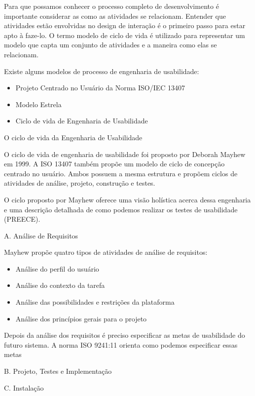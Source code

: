 	Para que possamos conhecer o processo completo de desenvolvimento é importante considerar as como as atividades se relacionam. Entender que atividades estão envolvidas no design de interação é o primeiro passo para estar apto à faze-lo.
	O termo modelo de ciclo de vida é utilizado para representar um modelo que capta um conjunto de atividades e a maneira como elas se relacionam. ~\cite{preece2005interacao}

	Existe alguns modelos de processo de engenharia de usabilidade:

\begin{itemize}
\item Projeto Centrado no Usuário da Norma ISO/IEC 13407
\item Modelo Estrela
\item Ciclo de vida de Engenharia de Usabilidade
\end{itemize}


O ciclo de vida da Engenharia de Usabilidade

	
	O ciclo de vida de engenharia de usabilidade foi proposto por Deborah Mayhew em 1999. 
A ISO 13407 também propõe um modelo de ciclo de concepção centrado no usuário. Ambos possuem a mesma estrutura e propõem ciclos de atividades de análise, projeto, construção e testes. ~\cite{cybis2010ergonomia}

	O ciclo proposto por Mayhew oferece uma visão holística acerca dessa engenharia e uma descrição detalhada de como podemos realizar os testes de usabilidade (PREECE).

A. Análise de Requisitos

	Mayhew propõe quatro tipos de atividades de análise de requisitos: 

\begin{itemize}
\item Análise do perfil do usuário
\item Análise do contexto da tarefa
\item Análise das possibilidades e restrições da plataforma
\item Análise dos princípios gerais para o projeto
\end{itemize}

	Depois da análise dos requisitos é preciso especificar as metas de usabilidade do futuro sistema. A norma ISO 9241:11 orienta como podemos especificar essas metas

B. Projeto, Testes e Implementação

	

C. Instalação



